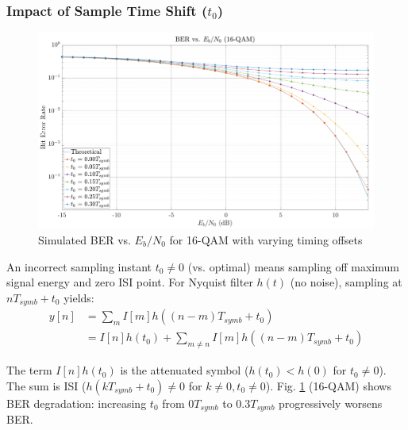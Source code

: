 \documentclass[11pt]{article}
\begin{document}
	\subsubsection{Impact of Sample Time Shift ($t_0$)}
	\begin{figure}[H]
		\centering
		\includegraphics[width=0.8\linewidth]{ber-timing}
		\caption{Simulated BER vs. $E_b/N_0$ for 16-QAM with varying timing offsets}
		\label{fig:ber-timing}
	\end{figure}
	An incorrect sampling instant $t_0 \neq 0$ (vs. optimal) means sampling off maximum signal energy and zero ISI point. For Nyquist filter $h(t)$ (no noise), sampling at $nT_{symb} + t_0$ yields:
	\begin{align}
		y[n] &= \sum_m I[m]h((n-m)T_{symb} + t_0) \\
		&= I[n]h(t_0) + \sum_{m \neq n} I[m]h((n-m)T_{symb} + t_0) \label{eq:timing_offset_impact_revised}
	\end{align}
	\par
	The term $I[n]h(t_0)$ is the attenuated symbol ($h(t_0) < h(0)$ for $t_0 \neq 0$). The sum is ISI ($h(kT_{symb} + t_0) \neq 0$ for $k \neq 0, t_0 \neq 0$). Fig. \ref{fig:ber-timing} (16-QAM) shows BER degradation: increasing $t_0$ from $0 T_{symb}$ to $0.3 T_{symb}$ progressively worsens BER.
	
\end{document}
